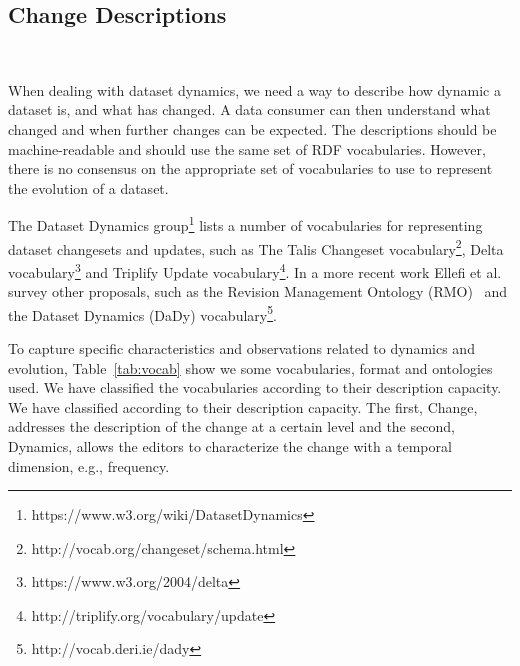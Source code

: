 \documentclass[sw]{iosart2x}
\begin{document}
\subsection{Change Descriptions}\label{Descriptions}
~\cite{PopitschHR10,UmbrichVH10,SandersonS12,MeimarisP16}

When dealing with dataset dynamics, we need a way to describe how dynamic a dataset is, and what has changed. A data consumer can then understand what changed and when further changes can be expected. The descriptions should be machine-readable and should use the same set of RDF vocabularies. However, there is no consensus on the appropriate set of vocabularies to use to represent the evolution of a dataset. 

The Dataset Dynamics group\footnote{https://www.w3.org/wiki/DatasetDynamics} lists a number of vocabularies for representing dataset changesets and updates, such as The Talis Changeset vocabulary\footnote{http://vocab.org/changeset/schema.html}, Delta vocabulary\footnote{https://www.w3.org/2004/delta} and Triplify Update vocabulary\footnote{http://triplify.org/vocabulary/update}. In a more recent work Ellefi et al.~\cite{Ellefi17} survey other proposals, such as the Revision Management Ontology (RMO)~\cite{GraubeHU14} and the Dataset Dynamics (DaDy) vocabulary\footnote{http://vocab.deri.ie/dady}.

To capture specific characteristics and observations related to dynamics and evolution, Table~\ref{tab:vocab} show we some vocabularies, format and ontologies used. We have classified the vocabularies according to their description capacity. We have classified according to their description capacity. The first, Change, addresses the description of the change at a certain level and the second, Dynamics, allows the editors to characterize the change with a temporal dimension, e.g., frequency.
\end{document}
